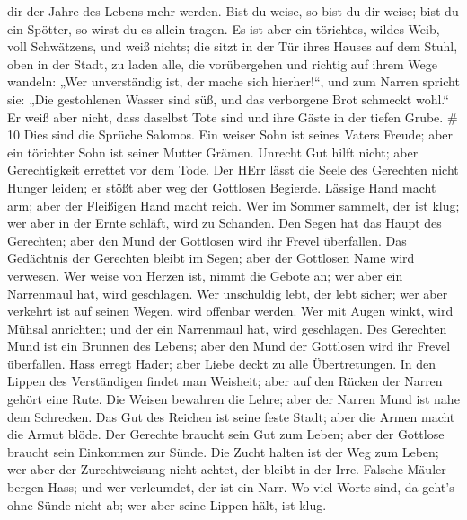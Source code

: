 dir der Jahre des Lebens mehr werden.  Bist du weise, so
bist du dir weise; bist du ein Spötter, so wirst du es allein tragen.
 Es ist aber ein törichtes, wildes Weib, voll Schwätzens,
und weiß nichts;  die sitzt in der Tür ihres Hauses auf dem
Stuhl, oben in der Stadt,  zu laden alle, die vorübergehen
und richtig auf ihrem Wege wandeln:  „Wer unverständig ist,
der mache sich hierher!{}``, und zum Narren spricht sie: 
„Die gestohlenen Wasser sind süß, und das verborgene Brot schmeckt
wohl.``  Er weiß aber nicht, dass daselbst Tote sind und
ihre Gäste in der tiefen Grube. \# 10  Dies sind die Sprüche
Salomos. Ein weiser Sohn ist seines Vaters Freude; aber ein törichter
Sohn ist seiner Mutter Grämen.  Unrecht Gut hilft nicht;
aber Gerechtigkeit errettet vor dem Tode.  Der HErr lässt
die Seele des Gerechten nicht Hunger leiden; er stößt aber weg der
Gottlosen Begierde.  Lässige Hand macht arm; aber der
Fleißigen Hand macht reich.  Wer im Sommer sammelt, der ist
klug; wer aber in der Ernte schläft, wird zu Schanden.  Den
Segen hat das Haupt des Gerechten; aber den Mund der Gottlosen wird ihr
Frevel überfallen.  Das Gedächtnis der Gerechten bleibt im
Segen; aber der Gottlosen Name wird verwesen.  Wer weise von
Herzen ist, nimmt die Gebote an; wer aber ein Narrenmaul hat, wird
geschlagen.  Wer unschuldig lebt, der lebt sicher; wer aber
verkehrt ist auf seinen Wegen, wird offenbar werden.  Wer
mit Augen winkt, wird Mühsal anrichten; und der ein Narrenmaul hat, wird
geschlagen.  Des Gerechten Mund ist ein Brunnen des Lebens;
aber den Mund der Gottlosen wird ihr Frevel überfallen. 
Hass erregt Hader; aber Liebe deckt zu alle Übertretungen. 
In den Lippen des Verständigen findet man Weisheit; aber auf den Rücken
der Narren gehört eine Rute.  Die Weisen bewahren die
Lehre; aber der Narren Mund ist nahe dem Schrecken.  Das
Gut des Reichen ist seine feste Stadt; aber die Armen macht die Armut
blöde.  Der Gerechte braucht sein Gut zum Leben; aber der
Gottlose braucht sein Einkommen zur Sünde.  Die Zucht
halten ist der Weg zum Leben; wer aber der Zurechtweisung nicht achtet,
der bleibt in der Irre.  Falsche Mäuler bergen Hass; und
wer verleumdet, der ist ein Narr.  Wo viel Worte sind, da
geht's ohne Sünde nicht ab; wer aber seine Lippen hält, ist klug.
